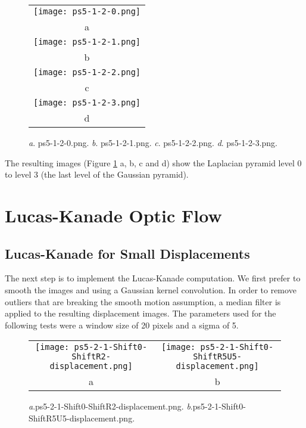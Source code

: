 \documentclass[a4paper,11pt]{article}
\begin{document}
\begin{figure}[H]
\begin{center}
\begin{tabular}{c}
	\texttt{[image: ps5-1-2-0.png]}\\
	a\\
	\texttt{[image: ps5-1-2-1.png]}\\
	b\\
	\texttt{[image: ps5-1-2-2.png]}\\
	c\\
	\texttt{[image: ps5-1-2-3.png]}\\
	d
\end{tabular}
\end{center}
\caption{ 
\textit{a}. ps5-1-2-0.png.  \textit{b}. ps5-1-2-1.png. \textit{c}. ps5-1-2-2.png.  \textit{d}. ps5-1-2-3.png.  }
\label{ps-5-2}
\end{figure}


The resulting images (Figure \ref{ps-5-2} a, b, c and d)  show the Laplacian pyramid level 0 to level 3 (the last level of the Gaussian pyramid).

\section{Lucas-Kanade Optic Flow}

\subsection{Lucas-Kanade for Small Displacements}

The next step is to implement the Lucas-Kanade computation. 
We first prefer to smooth the images and using a Gaussian kernel convolution.
In order to remove outliers that are breaking the smooth motion assumption, a median filter is applied to the resulting displacement images.
The parameters used for the following tests were a window size of 20 pixels and a sigma of 5.

\lstset{style=mystyle}




\begin{figure}[H]
\begin{center}
\begin{tabular}{cc}
	\texttt{[image: ps5-2-1-Shift0-ShiftR2-displacement.png]}&
	\texttt{[image: ps5-2-1-Shift0-ShiftR5U5-displacement.png]}\\
	a&b
\end{tabular}
\end{center}
\caption{ 
\textit{a}.ps5-2-1-Shift0-ShiftR2-displacement.png.  \textit{b}.ps5-2-1-Shift0-ShiftR5U5-displacement.png.  }
\label{ps-5-3}
\end{figure}
\end{document}
